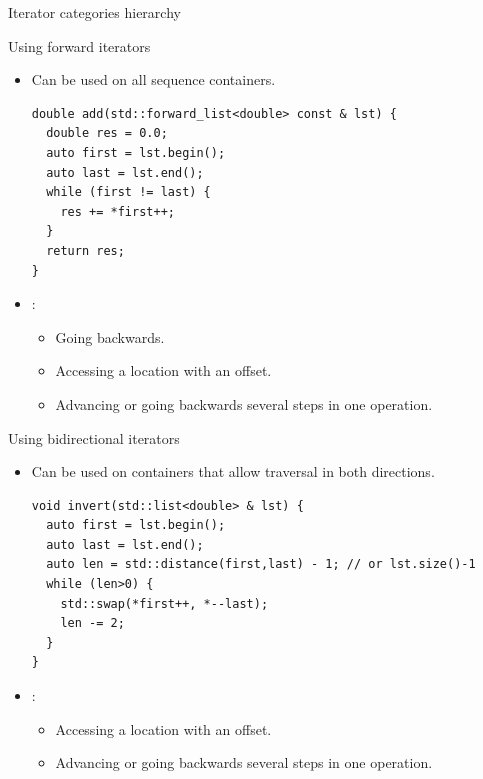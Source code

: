 \begin{frame}[t,fragile]{Iterator categories hierarchy}

\end{frame}

\begin{frame}[t,fragile]{Using forward iterators}
\begin{itemize}
  \item Can be used on all sequence containers.
\begin{lstlisting}
double add(std::forward_list<double> const & lst) {
  double res = 0.0;
  auto first = lst.begin();
  auto last = lst.end();
  while (first != last) {
    res += *first++;
  }
  return res;
}
\end{lstlisting}

  \item {}:
    \begin{itemize}
      \item Going backwards.
      \item Accessing a location with an offset.
      \item Advancing or going backwards several steps in one operation.
    \end{itemize}
\end{itemize}
\end{frame}

\begin{frame}[t,fragile]{Using bidirectional iterators}
\begin{itemize}
  \item Can be used on containers that allow traversal in both directions.
\begin{lstlisting}
void invert(std::list<double> & lst) {
  auto first = lst.begin();
  auto last = lst.end();
  auto len = std::distance(first,last) - 1; // or lst.size()-1
  while (len>0) {
    std::swap(*first++, *--last);
    len -= 2;
  }
}
\end{lstlisting}

  \item {}:
    \begin{itemize}
      \item Accessing a location with an offset.
      \item Advancing or going backwards several steps in one operation.
    \end{itemize}
\end{itemize}
\end{frame}

